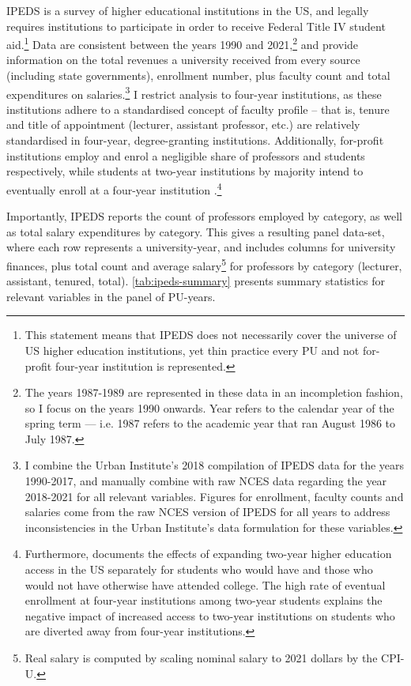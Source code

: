 \documentclass[notitlepage,12pt]{article}
\begin{document}
IPEDS is a survey of higher educational institutions in the US, and legally requires institutions to participate in order to receive Federal Title IV student aid.\footnote{
    This statement means that IPEDS does not necessarily cover the universe of US higher education institutions, yet thin practice every PU and not for-profit four-year institution is represented.
}
Data are consistent between the years 1990 and 2021,\footnote{
    The years 1987-1989 are represented in these data in an incompletion fashion, so I focus on the years 1990 onwards.
    Year refers to the calendar year of the spring term --- i.e. 1987 refers to the academic year that ran August 1986 to July 1987.
}
and provide information on the total revenues a university received from every source (including state governments), enrollment number, plus faculty count and total expenditures on salaries.\footnote{
    I combine the Urban Institute's 2018 compilation of IPEDS data for the years 1990-2017, and manually combine with raw NCES data regarding the year 2018-2021 for all relevant variables.
    Figures for enrollment, faculty counts and salaries come from the raw NCES version of IPEDS for all years to address inconsistencies in the Urban Institute's data formulation for these variables.
}
I restrict analysis to four-year institutions, as these institutions adhere to a standardised concept of faculty profile -- that is, tenure and title of appointment (lecturer, assistant professor, etc.) are relatively standardised in four-year, degree-granting institutions.
Additionally, for-profit institutions employ and enrol a negligible share of professors and students respectively, while students at two-year institutions by majority intend to eventually enroll at a four-year institution \citep{mountjoy2022}.\footnote{
    Furthermore, \cite{mountjoy2022} documents the effects of expanding two-year higher education access in the US separately for students who would have and those who would not have otherwise have attended college.
    The high rate of eventual enrollment at four-year institutions among two-year students explains the negative impact of increased access to two-year institutions on students who are diverted away from four-year institutions.
}

Importantly, IPEDS reports the count of professors employed by category, as well as total salary expenditures by category.
This gives a resulting panel data-set, where each row represents a university-year, and includes columns for university finances, plus total count and average salary\footnote{
    Real salary is computed by scaling nominal salary to 2021 dollars by the CPI-U.
} for professors by category (lecturer, assistant, tenured, total).
\autoref{tab:ipeds-summary} presents summary statistics for relevant variables in the panel of PU-years.
\end{document}
